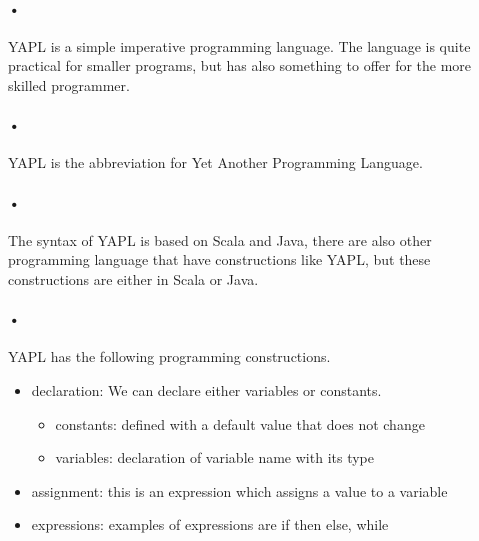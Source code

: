 \paragraph{•}
YAPL is a simple imperative programming language. The language is quite practical for smaller programs, but has also something to offer for the more skilled programmer.
\paragraph{•}
YAPL is the abbreviation for Yet Another Programming Language.
\paragraph{•}
The syntax of YAPL is based on Scala and Java, there are also other programming language that have constructions like YAPL, but these constructions are either in Scala or Java.
\paragraph{•}
YAPL has the following programming constructions.

\begin{itemize}
\item declaration: We can declare either variables or constants.
\begin{itemize}
\item constants: defined with a default value that does not change
\item variables: declaration of variable name with its type
\end{itemize}
\item assignment: this is an expression which assigns a value to a variable
\item expressions: examples of expressions are if then else, while
\end{itemize}